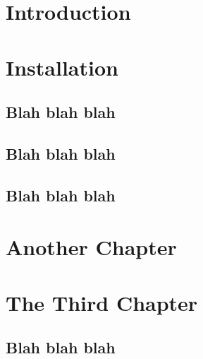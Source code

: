 

\renewcommand{\doctitleB}[0]{用户手册}


    \makecoverpage
    \setcounter{tocdepth}{1}
    \sffamily{\tableofcontents}
    \clearpage
    \pagestyle{plain}
    \rmfamily\mdseries\normalsize

    \chapter*{Introduction}

    \lipsum[1]

    \lipsum[1]



    \chapter{Installation}
    \lipsum[1]
    
    \section{Blah blah blah}
    \lipsum[1]
    
    \section{Blah blah blah}
    \lipsum[1]
    
    \section{Blah blah blah}
    \lipsum[1]



    \chapter{Another Chapter}
    \lipsum[1]
    
    \lipsum[1]



    \chapter{The Third Chapter}
    \lipsum[1]
    
    \section{Blah blah blah}
    \lipsum[1]
    
